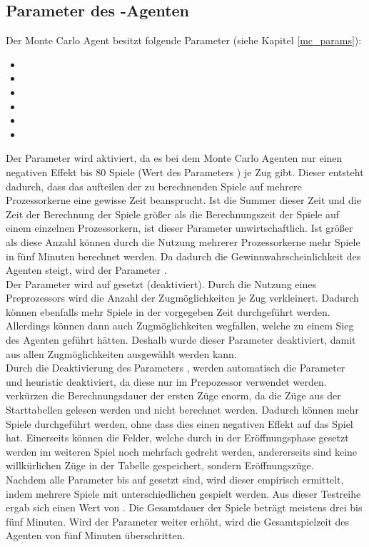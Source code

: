 \subsection*{Parameter des -Agenten}
\label{eval:agents:params:subsec-mc}
Der Monte Carlo Agent besitzt folgende Parameter (siehe Kapitel \ref{mc_params}):
\begin{itemize}
\item {}
\item {}
\item {}
\item {}
\item {}
\item {} 
\end{itemize}
Der Parameter  wird aktiviert, da es bei dem Monte Carlo Agenten nur einen negativen Effekt bis 80 Spiele (Wert des Parameters ) je Zug gibt. Dieser entsteht dadurch, dass das aufteilen der zu berechnenden Spiele auf mehrere Prozessorkerne eine gewisse Zeit beansprucht. Ist die Summer dieser Zeit und die Zeit der Berechnung der Spiele größer als die Berechnungszeit der Spiele auf einem einzelnen Prozessorkern, ist dieser Parameter unwirtschaftlich. Ist  größer als diese Anzahl können durch die Nutzung mehrerer Prozessorkerne mehr Spiele in fünf Minuten berechnet werden. Da dadurch die Gewinnwahrscheinlichkeit des Agenten steigt, wird der Parameter .
\\Der Parameter  wird auf  gesetzt (deaktiviert). Durch die Nutzung eines Preprozessors wird die Anzahl der Zugmöglichkeiten je Zug verkleinert. Dadurch können ebenfalls mehr Spiele in der vorgegeben Zeit durchgeführt werden. Allerdings können dann auch Zugmöglichkeiten wegfallen, welche zu einem Sieg des Agenten geführt hätten. Deshalb wurde dieser Parameter deaktiviert, damit aus allen Zugmöglichkeiten ausgewählt werden kann.
\\Durch die Deaktivierung des Parameters , werden automatisch die Parameter \\ und {heuristic} deaktiviert, da diese nur im Prepozessor verwendet werden.
\\ verkürzen die Berechnungsdauer der ersten Züge enorm, da die Züge aus der Starttabellen gelesen werden und nicht berechnet werden. Dadurch können mehr Spiele durchgeführt werden, ohne dass dies einen negativen Effekt auf das Spiel hat. Einerseits können die Felder, welche durch in der Eröffnungsphase gesetzt werden im weiteren Spiel noch mehrfach gedreht werden, andererseits sind keine willkürlichen Züge in der Tabelle gespeichert, sondern  Eröffnungszüge.
\\Nachdem alle Parameter bis auf  gesetzt sind, wird dieser empirisch ermittelt, indem mehrere Spiele mit unterschiedlichen  gespielt werden. Aus dieser Testreihe ergab sich einen  Wert von . Die Gesamtdauer der Spiele beträgt meistens drei bis fünf Minuten. Wird der Parameter weiter erhöht, wird die Gesamtspielzeit des Agenten von fünf Minuten überschritten.
